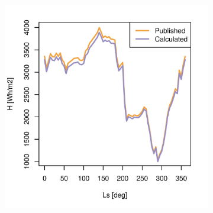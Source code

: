 \begin{figure}[H]
\captionsetup[subfigure]{justification=centering}
\vspace{-2ex}
\centering
    \setlength{\subfigureWidth}{0.50\textwidth}
    \setlength{\graphicsHeight}{80mm}
    \hypersetup{hidelinks=true}%
    \begin{subfigure}[t]{\subfigureWidth}
        \centering
            \includegraphics[height=\graphicsHeight]{sections/appendix/insolation-calculation-verification/plots/h-exp-calc-at-vl1-with-beta-223-deg.png}
            \label{fig:sub:comparative-global-insolation-at-vl1-beta-equals-phi-daily-variations}
    \end{subfigure}\hfill
    \begin{subfigure}[t]{\subfigureWidth}
        \centering

\end{subfigure}
\end{figure}
